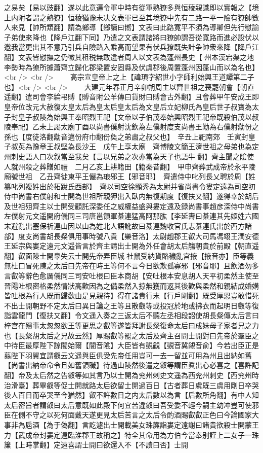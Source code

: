 之易矣【易以豉翻】遂以此意遍令軍中時有從軍熟獠多與恒稜親識即以實報之【境上内附者謂之熟獠】恒稜猶豫未决文表軍已至其境獠中先有二路一平一險有獠帥數人來見【帥所類翻】請為鄉導【鄉讀曰嚮】文表曰此路寛平不須為導卿但先行慰諭子弟使來降也【降戶江翻下同】乃遣之文表謂諸將曰獠帥謂吾從寛路而進必設伏以邀我當更出其不意乃引兵自險路入乘高而望果有伏兵獠既失計争帥衆來降【降戶江翻】文表皆慰撫之仍徵其租税無敢違者周人以文表為蓬州長史【州本漢宕渠之地李勢時為獠所據蕭齊立歸化郡梁置安固縣及伏虞郡後周置蓬州因蓬山而以為名也】<br />
<br />
　　高宗宣皇帝上之上【諱頊字紹世小字師利始興王道譚第二子也】<br />
<br />
　　大建元年春正月辛卯朔周主以齊世祖之喪罷朝會【朝直遥翻】遣司會李綸弔賻【賻音附公羊傳曰貨財曰賻會古外翻】且會葬甲午安成王即皇帝位改元大赦復太皇太后為皇太后皇太后為文皇后立妃柳氏為皇后世子叔寶為太子封皇子叔陵為始興王奉昭烈王祀【文帝以子伯茂奉始興昭烈王祀帝既殺伯茂以叔陵奉祀】乙未上謁太廟丁酉以尚書僕射沈欽為左僕射度支尚書王勱為右僕射勱份之孫也【度徒洛翻勱音邁份府巾翻份奐之弟肅之叔父也】　辛丑上祀南郊　壬寅封皇子叔英為豫章王叔堅為長沙王　戊午上享太廟　齊博陵文簡王濟世祖之母弟也為定州刺史語人曰次叙當至我矣【言以兄弟之次亦當為天子也語牛翻】齊主聞之隂使人就州殺之葬贈如禮　二月乙亥上耕籍田【籍秦昔翻】　甲申齊葬武成帝於永平陵廟號世祖　乙丑齊徙東平王儼為琅邪王【邪音耶】　齊遣侍中叱列長乂聘於周【姓纂叱列複姓出於拓跋氏西部】　齊以司空徐顯秀為太尉并省尚書令婁定遠為司空初侍中尚書右僕射和士開為世祖所親狎出入臥内無復期度【復扶又翻】遂得幸於胡后及世祖殂齊主以士開受顧託深委任之威權益盛與婁定遠及録尚書事趙彦深侍中尚書左僕射元文遥開府儀同三司唐邕領軍綦連猛高阿那肱【李延夀曰綦連其先姬姓六國末避亂出塞保祈連山因以山為姓北人語訛故曰綦連魏收官氏志綦連氏出於西方諸部】度支尚書胡長粲俱用事時號八貴【樂音洛】太尉趙郡王叡大司馬馮翊王潤安德王延宗與婁定遠元文遥皆言於齊主請出士開為外任會胡太后觴朝貴於前殿【朝直遥翻】叡面陳士開辠失云士開先帝弄臣城社鼠受納貨賂穢亂宫掖【掖音亦】臣等義無杜口冒死陳之太后曰先帝在時王等何不言今日欲欺孤寡邪【邪音耶】且飲酒勿多言叡等辭色愈厲儀同三司安吐根曰臣本商胡【安吐根本安息胡人天平初柔然主使至晉陽吐根密格柔然情狀高歡因為之備柔然入掠無獲而返其後歡與柔然和親結成婚媾皆吐根為行人既而歸歡由是見親待】得在諸貴行末【行戶剛翻】既受厚恩豈敢惜死不出士開朝野不定太后曰異日論之王等且散叡等或投冠於地或拂衣而起明日叡等復詣雲龍門【復扶又翻】令文遥入奏之三返太后不聽左丞相段韶使胡長粲傳太后言曰梓宫在殯事太怱怱欲王等更思之叡等遂皆拜謝長粲復命太后曰成妹母子家者兄之力也【長粲胡太后之兄故云然】厚賜叡等罷之太后及齊主召問士開對曰先帝於羣臣之中待臣最厚陛下諒闇始爾【闇音隂】大臣皆有覬覦【覬音冀覦音俞】今若出臣正是翦陛下羽翼宜謂叡云文遥與臣俱受先帝任用豈可一去一留並可用為州且出納如舊【尚書出納帝命令且如舊領職】待過山陵然後遣之叡等謂臣眞出心必喜之【喜許記翻】帝及太后然之告叡等如其言乃以士開為兖州刺史文遥為西兖州刺史【西兖州時治滑臺】葬畢叡等促士開就路太后欲留士開過百日【古者葬日虞既三虞用剛日卒哭後人百日而卒哭至今猶然】叡不許數日之内太后數以為言【后數所角翻】有中人知太后密旨者謂叡曰太后意既如此殿下何宜苦違叡曰吾受委不輕今嗣主幼冲豈可使邪臣在側不守之以死何面戴天遂更見太后苦言之太后令酌酒賜叡叡正色曰今論國家大事非為巵酒【為于偽翻】言訖遽出士開載美女珠簾詣婁定遠謝曰諸貴欲殺士開蒙王力【武成帝封婁定遠臨淮郡王故稱之】特全其命用為方伯今當奉别謹上二女子一珠簾【上時掌翻】定遠喜謂士開曰欲還入不【不讀曰否】士開